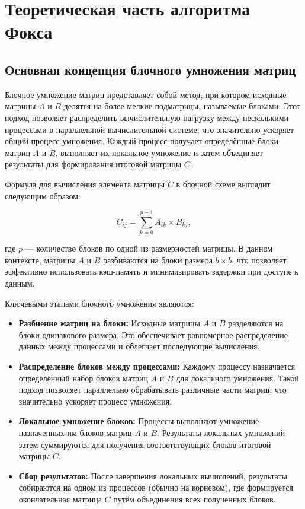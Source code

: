\documentclass{report}
\begin{document}
\newpage

\section*{Теоретическая часть алгоритма Фокса}

\subsection*{Основная концепция блочного умножения матриц}

Блочное умножение матриц представляет собой метод, при котором исходные матрицы $A$ и $B$ делятся на более мелкие подматрицы, называемые блоками. Этот подход позволяет распределить вычислительную нагрузку между несколькими процессами в параллельной вычислительной системе, что значительно ускоряет общий процесс умножения. Каждый процесс получает определённые блоки матриц $A$ и $B$, выполняет их локальное умножение и затем объединяет результаты для формирования итоговой матрицы $C$.

Формула для вычисления элемента матрицы $C$ в блочной схеме выглядит следующим образом:

$$
C_{ij} = \sum_{k=0}^{p-1} A_{ik} \times B_{kj},
$$

где $p$ — количество блоков по одной из размерностей матрицы. В данном контексте, матрицы $A$ и $B$ разбиваются на блоки размера $b \times b$, что позволяет эффективно использовать кэш-память и минимизировать задержки при доступе к данным.

Ключевыми этапами блочного умножения являются:

\begin{itemize}
    \item \textbf{Разбиение матриц на блоки:} Исходные матрицы $A$ и $B$ разделяются на блоки одинакового размера. Это обеспечивает равномерное распределение данных между процессами и облегчает последующие вычисления.
    
    \item \textbf{Распределение блоков между процессами:} Каждому процессу назначается определённый набор блоков матриц $A$ и $B$ для локального умножения. Такой подход позволяет параллельно обрабатывать различные части матриц, что значительно ускоряет процесс умножения.
    
    \item \textbf{Локальное умножение блоков:} Процессы выполняют умножение назначенных им блоков матриц $A$ и $B$. Результаты локальных умножений затем суммируются для получения соответствующих блоков итоговой матрицы $C$.
    
    \item \textbf{Сбор результатов:} После завершения локальных вычислений, результаты собираются на одном из процессов (обычно на корневом), где формируется окончательная матрица $C$ путём объединения всех полученных блоков.
\end{itemize}
\end{document}
